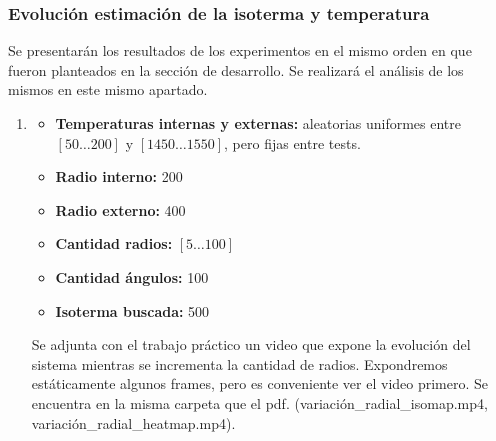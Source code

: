 \subsubsection{Evolución estimación de la isoterma y temperatura}
Se presentarán los resultados de los experimentos en el mismo orden en que fueron planteados en la sección de desarrollo. Se realizará el análisis de los mismos en este mismo apartado.
\begin{enumerate}
	\item \begin{itemize}
				\item \textbf{Temperaturas internas y externas:} aleatorias uniformes entre $[50\dots200]$ y $[1450\dots1550]$, pero fijas entre tests.
				\item \textbf{Radio interno:} 200
				\item \textbf{Radio externo:} 400
				\item \textbf{Cantidad radios:} $[5\dots100]$
				\item \textbf{Cantidad ángulos:} 100
				\item \textbf{Isoterma buscada:} 500
			\end{itemize}
Se adjunta con el trabajo práctico un video que expone la evolución del sistema mientras se incrementa la cantidad de radios. Expondremos estáticamente algunos frames, pero es conveniente ver el video primero. Se encuentra en la misma carpeta que el pdf. (variación\_radial\_isomap.mp4, variación\_radial\_heatmap.mp4).

\vspace{0.5cm}


\end{enumerate}
